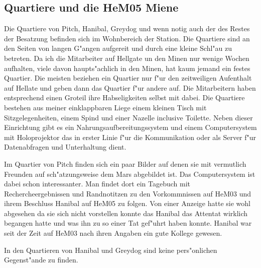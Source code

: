 \subsection{Quartiere und die HeM05 Miene}

Die Quartiere von Pitch, Hanibal, Greydog und wenn notig auch der des Restes der Besatzung befinden sich im Wohnbereich der Station. Die Quartiere sind an den Seiten von langen G"angen aufgereit und durch eine kleine Schl"au\3 zu betreten. Da ich die Mitarbeiter auf Hellgate un den Minen nur wenige Wochen aufhalten, viele davon haupts"achlich in den Minen, hat kaum jemand ein festes Quartier. Die meisten beziehen ein Quartier nur f"ur den zeitweiligen Aufenthalt auf Hellate und geben dann das Quartier f"ur andere auf. Die Mitarbeitern haben entsprechend einen Gro\3teil ihre Habseligkeiten selbst mit dabei. Die Quartiere bestehen aus meiner einklappbaren Liege einem kleinen Tisch mit Sitzgelegenheiten, einem Spind und einer Na\3zelle inclusive Toilette. Neben dieser Einrichtung gibt es ein Nahrungsaufbereitungssystem und einem Computersystem mit Holoprojektor das in erster Linie f"ur die Kommunikation oder als Server f"ur Datenabfragen und Unterhaltung dient.

Im Quartier von Pitch finden sich ein paar Bilder auf denen sie mit vermutlich Freunden auf sch"atzungsweise dem Mars abgebildet ist. Das Computersystem ist dabei schon interessanter. Man findet dort ein Tagebuch mit Rechercheergebnissen und Randnotitzen zu den Vorkommnissen auf HeM03 und ihrem Beschluss Hanibal auf HeM05 zu folgen. Von einer Anzeige hatte sie wohl abgesehen da sie sich nicht vorstellen konnte das Hanibal das Attentat wirklich begangen hatte und was ihn zu so einer Tat gef"uhrt haben konnte. Hanibal war seit der Zeit auf HeM03 nach ihren Angaben ein gute Kollege gewesen.

In den Quartieren von Hanibal und Greydog sind keine pers"onlichen Gegenst"ande zu finden.


